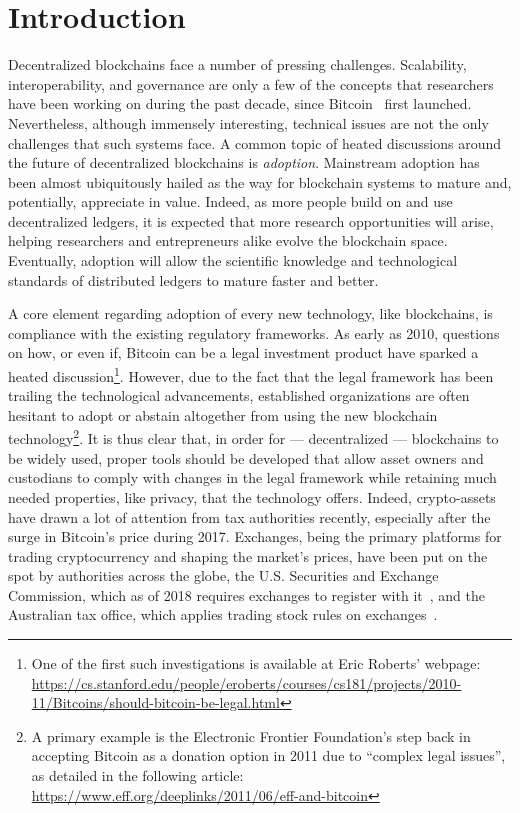 \section{Introduction}\label{sec:introduction}

Decentralized blockchains face a number of pressing challenges.  Scalability,
interoperability, and governance are only a few of the concepts that
researchers have been working on during the past decade, since
Bitcoin~\cite{nakamoto2008bitcoin} first launched. Nevertheless, although
immensely interesting, technical issues are not the only challenges that such
systems face. A common topic of heated discussions around the future of
decentralized blockchains is \emph{adoption}.  Mainstream adoption has been
almost ubiquitously hailed as the way for blockchain systems to mature and,
potentially, appreciate in value. Indeed, as more people build on and use
decentralized ledgers, it is expected that more research opportunities will
arise, helping researchers and entrepreneurs alike evolve the blockchain space.
Eventually, adoption will allow the scientific knowledge and technological
standards of distributed ledgers to mature faster and better.

A core element regarding adoption of every new technology, like blockchains, is
compliance with the existing regulatory frameworks. As early as 2010, questions
on how, or even if, Bitcoin can be a legal investment product have sparked a
heated discussion\footnote{One of the first such investigations is available at
Eric Roberts' webpage:
\url{https://cs.stanford.edu/people/eroberts/courses/cs181/projects/2010-11/Bitcoins/should-bitcoin-be-legal.html}}.
However, due to the fact that the legal framework has been trailing the
technological advancements, established organizations are often hesitant to
adopt or abstain altogether from using the new blockchain technology\footnote{A
primary example is the Electronic Frontier Foundation's step back in accepting
Bitcoin as a donation option in 2011 due to ``complex legal issues'', as
detailed in the following article:
\url{https://www.eff.org/deeplinks/2011/06/eff-and-bitcoin}}. It is thus clear
that, in order for --- decentralized --- blockchains to be widely used, proper
tools should be developed that allow asset owners and custodians to comply with
changes in the legal framework while retaining much needed properties, like
privacy, that the technology offers. Indeed, crypto-assets have drawn a lot of
attention from tax authorities recently, especially after the surge in
Bitcoin's price during 2017.  Exchanges, being the primary platforms for
trading cryptocurrency and shaping the market's prices, have been put on the
spot by authorities across the globe, \eg the U.S. Securities and Exchange
Commission, which as of 2018 requires exchanges to register with
it~\cite{securities2018statement}, and the Australian tax office, which applies
trading stock rules on exchanges~\cite{tax2019statement}.

